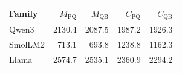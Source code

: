 \begin{tabular*}{\columnwidth}{@{\extracolsep{\fill}}lrrrr@{}}
\toprule
Family & $M_{\mathrm{PQ}}$ & $M_{\mathrm{QB}}$ & $C_{\mathrm{PQ}}$ & $C_{\mathrm{QB}}$ \\
\midrule
Qwen3 & 2130.4 & 2087.5 & 1987.2 & 1926.3 \\
SmolLM2 & 713.1 & 693.8 & 1238.8 & 1162.3 \\
Llama & 2574.7 & 2535.1 & 2360.9 & 2294.2 \\
\bottomrule
\end{tabular*}
